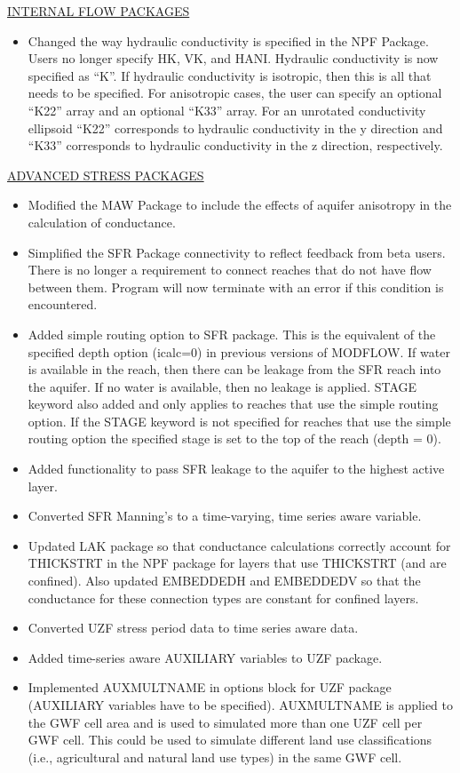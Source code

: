 	\underline{INTERNAL FLOW PACKAGES}
	\begin{itemize}
		\item Changed the way hydraulic conductivity is specified in the NPF Package.  Users no longer specify HK, VK, and HANI.  Hydraulic conductivity is now specified as ``K''.  If hydraulic conductivity is isotropic, then this is all that needs to be specified.  For anisotropic cases, the user can specify an optional ``K22'' array and an optional ``K33'' array.  For an unrotated conductivity ellipsoid ``K22'' corresponds to hydraulic conductivity in the y direction and ``K33'' corresponds to hydraulic conductivity in the z direction, respectively.
	\end {itemize}
	
	\underline{ADVANCED STRESS PACKAGES}
	\begin{itemize}
		\item Modified the MAW Package to include the effects of aquifer anisotropy in the calculation of conductance.
		\item Simplified the SFR Package connectivity to reflect feedback from beta users. There is no longer a requirement to connect reaches that do not have flow between them.  Program will now terminate with an error if this condition is encountered.
		\item Added simple routing option to SFR package. This is the equivalent of the specified depth option (icalc=0) in previous versions of MODFLOW. If water is available in the reach, then there can be leakage from the SFR reach into the aquifer.  If no water is available, then no leakage is applied.  STAGE keyword also added and only applies to reaches that use the simple routing option. If the STAGE keyword is not specified for reaches that use the simple routing option the specified stage is set to the top of the reach (depth = 0).
		\item Added functionality to pass SFR leakage to the aquifer to the highest active layer.
		\item Converted SFR Manning's to a time-varying, time series aware variable.  
		\item Updated LAK package so that conductance calculations correctly account for THICKSTRT in the NPF package for layers that use THICKSTRT (and are confined). Also updated EMBEDDEDH and EMBEDDEDV so that the conductance for these connection types are constant for confined layers.
		\item Converted UZF stress period data to time series aware data.
		\item Added time-series aware AUXILIARY variables to UZF package.
		\item Implemented AUXMULTNAME in options block for UZF package (AUXILIARY variables have to be specified). AUXMULTNAME is applied to the GWF cell area and is used to simulated more than one UZF cell per GWF cell. This could be used to simulate different land use classifications (i.e., agricultural and natural land use types) in the same GWF cell.
	\end{itemize}
	
